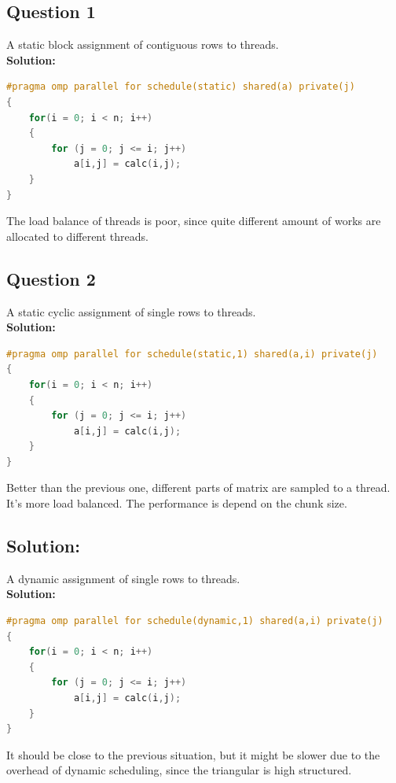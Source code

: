 \documentclass{article}
\begin{document}
\subsection{Question 1}
A static block assignment of contiguous rows to threads. 
\\\textbf{Solution: }
\begin{lstlisting}[language=c++]
#pragma omp parallel for schedule(static) shared(a) private(j)
{
    for(i = 0; i < n; i++)
    {
        for (j = 0; j <= i; j++) 
            a[i,j] = calc(i,j);
    }
}
\end{lstlisting}
The load balance of threads is poor, since quite different amount of works are allocated to different threads.
\subsection{Question 2}
A static cyclic assignment of single rows to threads. 
\\\textbf{Solution: }
\begin{lstlisting}[language=c++]
#pragma omp parallel for schedule(static,1) shared(a,i) private(j)
{
    for(i = 0; i < n; i++)
    {
        for (j = 0; j <= i; j++) 
            a[i,j] = calc(i,j);
    }
}
\end{lstlisting}
Better than the previous one, different parts of matrix are sampled to a thread. It's more load balanced. The performance is depend on the chunk size.
\subsection{Solution: }
A dynamic assignment of single rows to threads. 
\\\textbf{Solution: }
\begin{lstlisting}[language=c++]
#pragma omp parallel for schedule(dynamic,1) shared(a,i) private(j)
{
    for(i = 0; i < n; i++)
    {
        for (j = 0; j <= i; j++) 
            a[i,j] = calc(i,j);
    }
}
\end{lstlisting}
It should be close to the previous situation, but it might be slower due to the overhead of dynamic scheduling, since the triangular is high structured.
\end{document}
